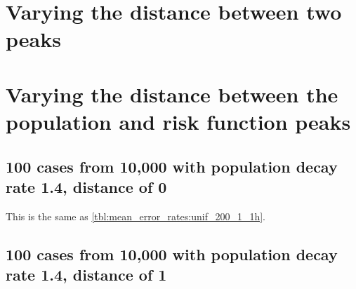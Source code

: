 \section{Varying the distance between two peaks}


\section{Varying the distance between the population and risk function peaks}

\subsection{100 cases from 10,000 with population decay rate 1.4, distance of 0}

This is the same as \cref{tbl:mean_error_rates:unif_200_1_1h}.

\begin{table}[H]
\centering
\scriptsize

    \begin{subtable}{0.5\textwidth}
    
    \caption{Means} 
    \end{subtable}%
    \begin{subtable}{0.5\textwidth}
    
    \caption{Standard deviations} 
    \end{subtable}

\caption{Error rates for uniform population of 10,000, single peak intensity of factor 100 and decay rate 1.4, distance between population peak and risk peak is 0}
\label{tbl:mean_error_rates:p1.4_100_1_1h:2}
\end{table}

\subsection{100 cases from 10,000 with population decay rate 1.4, distance of 1}
\begin{table}[H]
\centering
\scriptsize

    \begin{subtable}{0.5\textwidth}
    
    \caption{Means} 
    \end{subtable}%
    \begin{subtable}{0.5\textwidth}
    
    \caption{Standard deviations} 
    \end{subtable}

\caption{Error rates for uniform population of 10,000, single peak intensity of factor 100 and decay rate 1.4, distance between population peak and risk peak is 1}
\label{tbl:mean_error_rates:p1.4_100_1_1h_1s}
\end{table}

